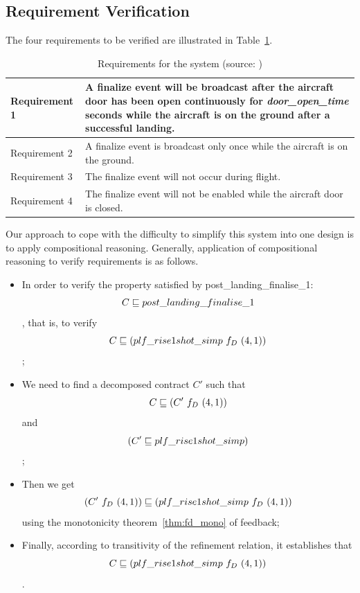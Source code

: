 \subsection{Requirement Verification}
\label{ssec:case_req}
The four requirements to be verified are illustrated in Table~\ref{tab:reqs}.
\begin{table}
    \centering
    \begin{tabular}{l|p{10cm}}
        \hline 
        Requirement 1 & A finalize event will be broadcast after the aircraft door has been open continuously for \emph{door\_open\_time} seconds while the aircraft is on the ground after a successful landing. \\
        \hline 
        Requirement 2 & A finalize event is broadcast only once while the aircraft is on the ground.\\
        \hline 
        Requirement 3 & The finalize event will not occur during flight. \\
        \hline 
        Requirement 4 & The finalize event will not be enabled while the aircraft door is closed. \\
        \hline
    \end{tabular}
    \caption{Requirements for the system (source: \cite{Bhatt2016})}
    \label{tab:reqs}
\end{table}

Our approach to cope with the difficulty to simplify this system into one design is to apply compositional reasoning. Generally, application of compositional reasoning to verify requirements is as follows.
\begin{itemize}
    \item In order to verify the property satisfied by \textsf{post\_landing\_finalise\_1}: \[C \refinedby post\_landing\_finalise\_1\], that is, to verify \[C \refinedby \left(plf\_rise1shot\_simp\ f_D\ (4, 1)\right)\];
    \item We need to find a decomposed contract $C'$ such that \[C \refinedby \left(C'\ f_D\ (4,1)\right)\] and \[\left(C' \refinedby plf\_rise1shot\_simp\right)\]; 
    \item Then we get \[\left(C'\ f_D\ (4,1)\right) \refinedby \left(plf\_rise1shot\_simp\ f_D\ (4, 1)\right)\] using the monotonicity theorem~\ref{thm:fd_mono} of feedback;
    \item Finally, according to transitivity of the refinement relation, it establishes that \[C \refinedby \left(plf\_rise1shot\_simp\ f_D\ (4, 1)\right)\].
\end{itemize}

